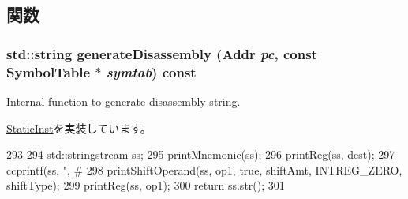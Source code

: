 \subsection{関数}
\hypertarget{classRegImmRegShiftOp_a95d323a22a5f07e14d6b4c9385a91896}{
\subsubsection[{generateDisassembly}]{\setlength{\rightskip}{0pt plus 5cm}std::string generateDisassembly ({\bf Addr} {\em pc}, \/  const SymbolTable $\ast$ {\em symtab}) const}}
\label{classRegImmRegShiftOp_a95d323a22a5f07e14d6b4c9385a91896}
Internal function to generate disassembly string. 

\hyperlink{classStaticInst_ab4a569d2623620c04f8a52bbd91d63b9}{StaticInst}を実装しています。


\begin{DoxyCode}
293 {
294     std::stringstream ss;
295     printMnemonic(ss);
296     printReg(ss, dest);
297     ccprintf(ss, ", #%
298     printShiftOperand(ss, op1, true, shiftAmt, INTREG_ZERO, shiftType);
299     printReg(ss, op1);
300     return ss.str();
301 }
\end{DoxyCode}


